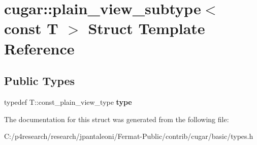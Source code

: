 \hypertarget{structcugar_1_1plain__view__subtype_3_01const_01_t_01_4}{}\section{cugar\+:\+:plain\+\_\+view\+\_\+subtype$<$ const T $>$ Struct Template Reference}
\label{structcugar_1_1plain__view__subtype_3_01const_01_t_01_4}
\subsection*{Public Types}
\begin{DoxyCompactItemize}
\item 
\mbox{\label{structcugar_1_1plain__view__subtype_3_01const_01_t_01_4_a157158d794fde252caa670810c07c8b0}} 
typedef T\+::const\+\_\+plain\+\_\+view\+\_\+type {\bfseries type}
\end{DoxyCompactItemize}


The documentation for this struct was generated from the following file\+:\begin{DoxyCompactItemize}
\item 
C\+:/p4research/research/jpantaleoni/\+Fermat-\/\+Public/contrib/cugar/basic/types.\+h\end{DoxyCompactItemize}
